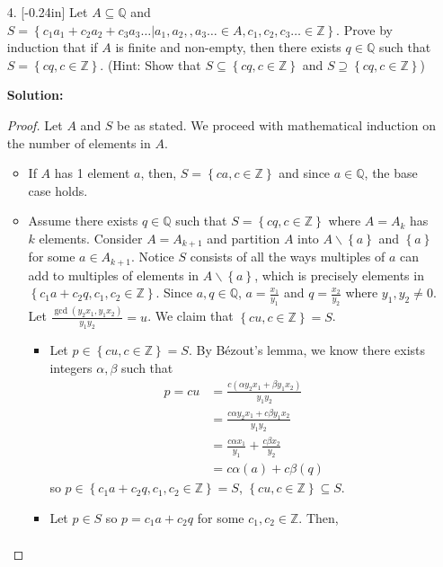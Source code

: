 \documentclass[letterpaper,12pt]{article}
\newcommand{\set}[1]{\left\{ #1 \right\}}
\theoremstyle{definition}
\begin{document}
\pagebreak
\begin{enumerate}
    \item[4.]\reversemarginpar{}[-0.24in] 
  Let $A\subseteq \mathbb{Q}$ and $S = \set{c_1a_1 + c_2a_2 + c_3a_3 \ldots | a_1,a_2,,a_3\ldots \in A, c_1,c_2,c_3 \ldots \in \mathbb{Z}}$. Prove by induction that if $A$ is finite and non-empty, then there exists $q \in \mathbb{Q}$ such that $S = \set{cq, c \in \mathbb{Z}}$. (Hint: Show that $S \subseteq \set{cq, c \in \mathbb{Z}}$ and $S \supseteq \set{cq, c \in \mathbb{Z}}$)
  \begin{mdframed}
  \textbf{Solution:}
      \begin{proof}
          Let $A$ and $S$ be as stated. We proceed with mathematical induction on the number of elements in $A$. \begin{itemize}
        \item If $A$ has 1 element $a$, then, $S = \set{ca, c \in \mathbb{Z}}$ and since $a \in \mathbb{Q}$, the base case holds.
        \item Assume there exists $q \in \mathbb{Q}$ such that $S = \set{cq, c \in \mathbb{Z}}$ where $A=A_{k}$ has $k$ elements. Consider $A=A_{k+1}$ and partition $A$ into $A\backslash \set{a}$ and $\set{a}$ for some $a \in A_{k+1}$. Notice $S$ consists of all the ways multiples of $a$ can add to multiples of elements in $ A\backslash \set{a}$, which is precisely elements in $\set{c_1 a + c_2 q, c_1,c_2 \in \mathbb{Z}}$. Since $a,q \in \mathbb{Q}$, $a = \frac{x_1}{y_1}$ and $q = \frac{x_2}{y_2}$ where $y_1,y_2 \neq 0$. Let $\frac{\gcd (y_2x_1,y_1x_2)}{y_1y_2} = u$. We claim that $\set{ cu, c \in \mathbb{Z} } = S$. \begin{itemize}
            \item Let $p \in \set{ cu, c \in \mathbb{Z} } = S$. By Bézout's lemma, we know there exists integers $\alpha,\beta$ such that \begin{align*}
                p = cu &= \frac{c( \alpha y_2x_1 + \beta y_1x_2)}{y_1y_2} \\
                &= \frac{c\alpha y_2x_1 + c\beta y_1x_2}{y_1y_2} \\
                &= \frac{c\alpha x_1}{y_1} + \frac{c\beta x_2}{y_2} \\
                &= c\alpha(a) + c\beta(q)
            \end{align*}
            so $p \in \set{c_1 a + c_2 q, c_1,c_2 \in \mathbb{Z}} = S$, $\set{ cu, c \in \mathbb{Z} } \subseteq S$.
            \item Let $p \in S$ so $p = c_1a + c_2 q$ for some $c_1, c_2 \in \mathbb{Z}$. Then, \begin{align*}

\end{align*}
\end{itemize}
\end{itemize}
\end{proof}
\end{mdframed}
\end{enumerate}
\end{document}
